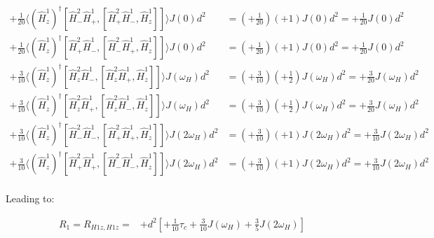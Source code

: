 \documentclass[notitlepage,11pt]{article}
\begin{document}
\begin{small}\begin{equation*}\begin{array}{rl} +\frac{1}{20}\langle (\hat{H}^1_z)^{\dagger} [\hat{H}^2_- \hat{H}^1_+ ,[\hat{H}^2_+ \hat{H}^1_- ,\hat{H}^1_z]] \rangle J\left(0\right)d^2 &= ( +\frac{1}{20})( + 1)J\left(0\right) d^2 =  +\frac{1}{20}J\left(0\right) d^2\\

 +\frac{1}{20}\langle (\hat{H}^1_z)^{\dagger} [\hat{H}^2_+ \hat{H}^1_- ,[\hat{H}^2_- \hat{H}^1_+ ,\hat{H}^1_z]] \rangle J\left(0\right)d^2 &= ( +\frac{1}{20})( + 1)J\left(0\right) d^2 =  +\frac{1}{20}J\left(0\right) d^2\\

 +\frac{3}{10}\langle (\hat{H}^1_z)^{\dagger} [\hat{H}^2_z\hat{H}^1_- ,[\hat{H}^2_z\hat{H}^1_+ ,\hat{H}^1_z]] \rangle J\left(\omega_H\right)d^2 &= ( +\frac{3}{10})( +\frac{1}{2})J\left(\omega_H\right) d^2 =  +\frac{3}{20}J\left(\omega_H\right) d^2\\

 +\frac{3}{10}\langle (\hat{H}^1_z)^{\dagger} [\hat{H}^2_z\hat{H}^1_+ ,[\hat{H}^2_z\hat{H}^1_- ,\hat{H}^1_z]] \rangle J\left(\omega_H\right)d^2 &= ( +\frac{3}{10})( +\frac{1}{2})J\left(\omega_H\right) d^2 =  +\frac{3}{20}J\left(\omega_H\right) d^2\\

 +\frac{3}{10}\langle (\hat{H}^1_z)^{\dagger} [\hat{H}^2_- \hat{H}^1_- ,[\hat{H}^2_+ \hat{H}^1_+ ,\hat{H}^1_z]] \rangle J\left(2\omega_H\right)d^2 &= ( +\frac{3}{10})( + 1)J\left(2\omega_H\right) d^2 =  +\frac{3}{10}J\left(2\omega_H\right) d^2\\

 +\frac{3}{10}\langle (\hat{H}^1_z)^{\dagger} [\hat{H}^2_+ \hat{H}^1_+ ,[\hat{H}^2_- \hat{H}^1_- ,\hat{H}^1_z]] \rangle J\left(2\omega_H\right)d^2 &= ( +\frac{3}{10})( + 1)J\left(2\omega_H\right) d^2 =  +\frac{3}{10}J\left(2\omega_H\right) d^2\\

\end{array}\end{equation*}\end{small}

Leading to:


\begin{small}
  \begin{equation}\begin{array}{rl}
R_1= R_{H1z,H1z}=
& + d^2 \left[ +\frac{1}{10} \tau_c +\frac{3}{10} J\left(\omega_H\right) +\frac{3}{5} J\left(2\omega_H\right)\right]\\
\end{array}\end{equation}
\end{small}
\end{document}
